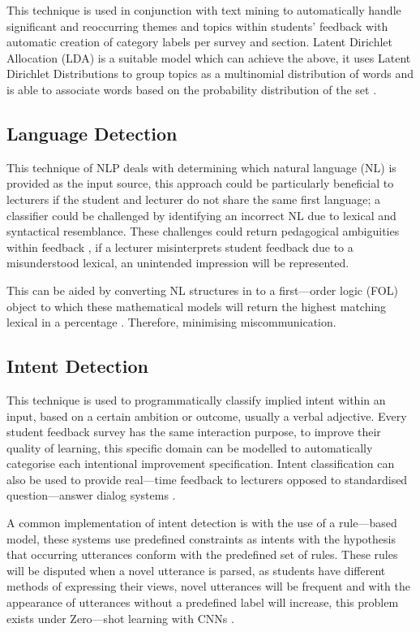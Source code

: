This technique is used in conjunction with text mining to automatically handle significant and reoccurring themes and topics within students’ feedback with automatic creation of category labels per survey and section. Latent Dirichlet Allocation (LDA) is a suitable model which can achieve the above, it uses Latent Dirichlet Distributions to group topics as a multinomial distribution of words and is able to associate words based on the probability distribution of the set \parencite{unankard2019topic}.

\subsection{Language Detection}

This technique of NLP deals with determining which natural language (NL) is provided as the input source, this approach could be particularly beneficial to lecturers if the student and lecturer do not share the same first language; a classifier could be challenged by identifying an incorrect NL due to lexical and syntactical resemblance. These challenges could return pedagogical ambiguities within feedback \parencite{heift2017computer}, if a lecturer misinterprets student feedback due to a misunderstood lexical, an unintended impression will be represented.

This can be aided by converting NL structures in to a first---order logic (FOL) object to which these mathematical models will return the highest matching lexical in a percentage \parencite{perikos2017assistance}. Therefore, minimising miscommunication.

\subsection{Intent Detection}

This technique is used to programmatically classify implied intent within an input, based on a certain ambition or outcome, usually a verbal adjective. Every student feedback survey has the same interaction purpose, to improve their quality of learning, this specific domain can be modelled to automatically categorise each intentional improvement specification. Intent classification can also be used to provide real---time feedback to lecturers opposed to standardised question---answer dialog systems \parencite{jensen2020toward}.

A common implementation of intent detection is with the use of a rule---based model, these systems use predefined constraints as intents with the hypothesis that occurring utterances conform with the predefined set of rules. These rules will be disputed when a novel utterance is parsed, as students have different methods of expressing their views, novel utterances will be frequent and with the appearance of utterances without a predefined label will increase, this problem exists under Zero---shot learning with CNNs \parencite{xia2018zero}.

